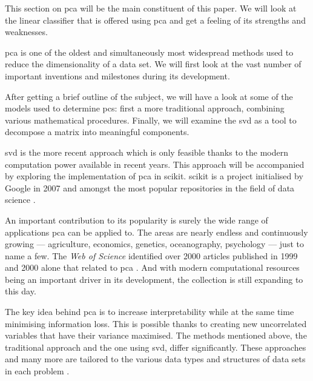 This section on \gls{pca} will be the main constituent of this paper.
We will look at the linear classifier that is offered using \gls{pca} and get a feeling of its strengths and weaknesses.
\bigskip


\Gls{pca} is one of the oldest and simultaneously most widespread methods used to reduce the dimensionality of a data set.
We will first look at the vast number of important inventions and milestones during its development.

After getting a brief outline of the subject, we will have a look at some of the models used to determine \glspl{pc}: first a more traditional approach, combining various mathematical procedures. 
Finally, we will examine the \gls{svd} as a tool to decompose a matrix into meaningful components.

\Gls{svd} is the more recent approach which is only feasible thanks to the modern computation power available in recent years.
This approach will be accompanied by exploring the implementation of \gls{pca} in \gls{scikit}.
\Gls{scikit} is a project initialised by Google in 2007 and amongst the most popular repositories in the field of data science \cite{scikit-learn}.
\bigskip


An important contribution to its popularity is surely the wide range of applications \gls{pca} can be applied to.
The areas are nearly endless and continuously growing --- agriculture, economics, genetics, oceanography, psychology --- just to name a few.
The \emph{Web of Science} identified over 2000 articles published in 1999 and 2000 alone that related to \gls{pca} \cite{Jolliffe2002book}.
And with modern computational resources being an important driver in its development, the collection is still expanding to this day.
\bigskip


The key idea behind \gls{pca} is to increase interpretability while at the same time minimising information loss. 
This is possible thanks to creating new uncorrelated variables that have their variance maximised.
The methods mentioned above, the traditional approach and the one using \gls{svd}, differ significantly. 
These approaches and many more are tailored to the various data types and structures of data sets in each problem \cite{jolliffe2016principal}.

